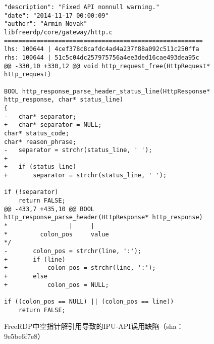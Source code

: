 \begin{figure}[t]
	\centering
\begin{lstlisting}
"description": "Fixed API nonnull warning."
"date": "2014-11-17 00:00:09"
"author": "Armin Novak"
libfreerdp/core/gateway/http.c
=======================================================
lhs: 100644 | 4cef378c8cafdc4ad4a237f88a092c511c250ffa
rhs: 100644 | 51c5c04dc257975756a4ee3ded16cae493dea95c
@@ -330,10 +330,12 @@ void http_request_free(HttpRequest* http_request)

BOOL http_response_parse_header_status_line(HttpResponse* http_response, char* status_line)
{
-	char* separator;
+	char* separator = NULL;
char* status_code;
char* reason_phrase;
-	separator = strchr(status_line, ' ');
+
+	if (status_line)
+		separator = strchr(status_line, ' ');

if (!separator)
	return FALSE;
@@ -433,7 +435,10 @@ BOOL http_response_parse_header(HttpResponse* http_response)
*                 |     |
*         colon_pos     value
*/
-		colon_pos = strchr(line, ':');
+		if (line)
+			colon_pos = strchr(line, ':');
+		else
+			colon_pos = NULL;

if ((colon_pos == NULL) || (colon_pos == line))
	return FALSE;

\end{lstlisting}
	\caption{
	FreeRDP中空指针解引用导致的IPU-API误用缺陷（sha：9e5be6f7e8）
	}
	\label{fig:2-3-ipu-1}
\end{figure}